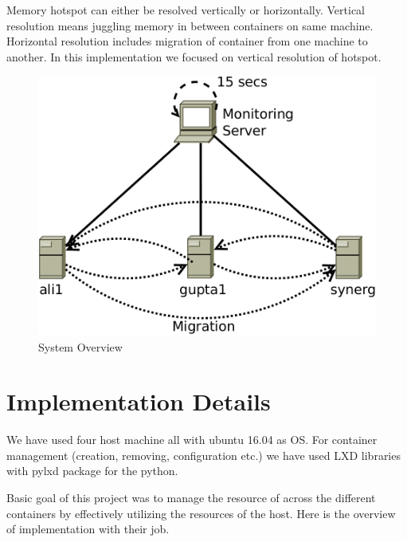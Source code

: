 \documentclass[a4paper, 11pt]{article}
\begin{document}
Memory hotspot can either be resolved vertically or horizontally. Vertical resolution means juggling memory in between containers on same machine. Horizontal resolution includes migration of container from one machine to another. In this implementation we focused on vertical resolution of hotspot.
\begin{figure}[!htb]
  \centering
  \includegraphics[scale=0.6]{system}
  \caption{System Overview}
\end{figure}

\section{Implementation Details}
We have used four host machine all with ubuntu 16.04 as OS. For container management (creation, removing, configuration etc.) we have used LXD libraries with pylxd \cite{pylxd} package for the python.

Basic goal of this project was to manage the resource of across the different containers by effectively utilizing the resources of the host.
Here is the overview of implementation with their job.
\end{document}
